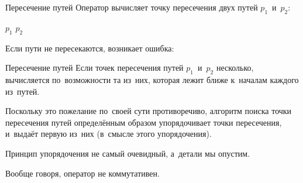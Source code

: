 \begin{frame}{Пересечение путей}
Оператор  вычисляет точку пересечения двух путей
$p_1$~и~$p_2$:
\begin{center}
\Large
$p_1$  $p_2$
\end{center}

Если пути не пересекаются, возникает ошибка:
\begin{screen}
%
%
\end{screen}
\end{frame}

\begin{frame}{Пересечение путей}
Если точек пересечения путей $p_1$~и~$p_2$ несколько, вычисляется
по~возможности та из~них, которая лежит ближе к~началам каждого из~путей.

Поскольку это пожелание по~своей сути противоречиво, алгоритм поиска точки
пересечения путей определённым образом упорядочивает точки пересечения,
и~выдаёт первую из~них (в~смысле этого упорядочения).

Принцип упорядочения не самый очевидный, а~детали мы опустим.

Вообще говоря, оператор  не коммутативен.
\end{frame}
